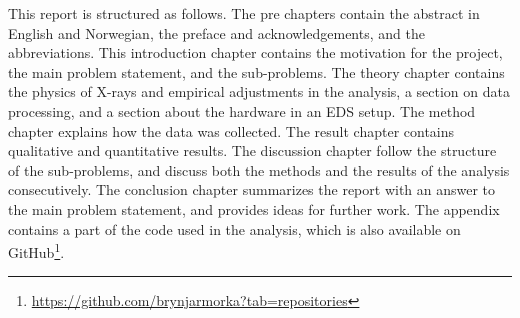 This report is structured as follows.
The pre chapters contain the abstract in English and Norwegian, the preface and acknowledgements, and the abbreviations.
This introduction chapter contains the motivation for the project, the main problem statement, and the sub-problems.
The theory chapter contains the physics of X-rays and empirical adjustments in the analysis, a section on data processing, and a section about the hardware in an EDS setup.
The method chapter explains how the data was collected.
The result chapter contains qualitative and quantitative results.
The discussion chapter follow the structure of the sub-problems, and discuss both the methods and the results of the analysis consecutively.
The conclusion chapter summarizes the report with an answer to the main problem statement, and provides ideas for further work.
The appendix contains a part of the code used in the analysis, which is also available on GitHub\footnote{\url{https://github.com/brynjarmorka?tab=repositories}}.